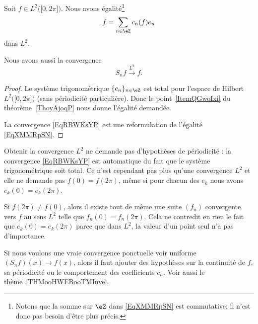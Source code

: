 \begin{theorem} \label{ThoYDKZLyv}
    Soit \( f\in L^2\big( \mathopen[ 0 , 2\pi \mathclose] \big)\). Nous avons égalité\footnote{Notons que la somme sur \( \eZ\) dans \eqref{EqXMMRpSN} est commutative; il n'est donc pas besoin d'être plus précis.}
    \begin{equation}    \label{EqXMMRpSN}
        f=\sum_{n\in \eZ}c_n(f)e_n
    \end{equation}
    dans \( L^2\).

    Nous avons aussi la convergence
\begin{equation}    \label{EqRBWKsYP}
    S_nf\stackrel{L^2}{\to} f.
\end{equation}
\end{theorem}

\begin{proof}
    Le système trigonométrique \( \{ e_n \}_{n\in \eZ}\) est total pour l'espace de Hilbert \( L^2\big( \mathopen[ 0 , 2\pi \mathclose] \big)\) (sans périodicité particulière). Donc le point~\ref{ItemQGwoIxi} du théorème~\ref{ThoyAjoqP} nous donne l'égalité demandée.

    La convergence \eqref{EqRBWKsYP} est une reformulation de l'égalité \eqref{EqXMMRpSN}.
\end{proof}

\begin{normaltext}
    Obtenir la convergence \( L^2\) ne demande pas d'hypothèses de périodicité : la convergence \eqref{EqRBWKsYP} est automatique du fait que le système trigonométrique soit total. Ce n'est cependant pas plus qu'une convergence \( L^2\) et elle ne demande pas \( f(0)=f(2\pi)\), même si pour chacun des \( e_k\) nous avons \( e_k(0)=e_k(2\pi)\).

    Si \( f(2\pi)\neq f(0)\), alors il existe tout de même une suite \( (f_n)\) convergente vers \( f\) au sens \( L^2\) telle que \( f_n(0)=f_n(2\pi)\). Cela ne contredit en rien le fait que \( e_k(0)=e_k(2\pi)\) parce que dans \( L^2\), la valeur d'un point seul n'a pas d'importance.

    Si nous voulons une vraie convergence ponctuelle voir uniforme \( (S_nf)(x)\to f(x)\), alors il faut ajouter des hypothèses sur la continuité de \( f\), sa périodicité ou le comportement des coefficients \( c_n\). Voir aussi le thème~\ref{THMooHWEBooTMInve}.
\end{normaltext}

